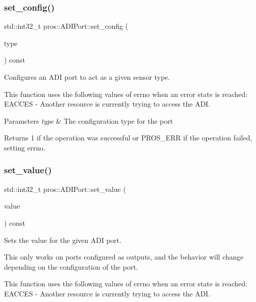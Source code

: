 \subsubsection{\texorpdfstring{set\_config()}{set\_config()}}
{\footnotesize\ttfamily std\+::int32\+\_\+t pros\+::\+A\+D\+I\+Port\+::set\+\_\+config (\begin{DoxyParamCaption}\item[{\mbox{\hyperlink{adi_8h_a4efff81399e823764aa05cd5c172ea55}{adi\+\_\+port\+\_\+config\+\_\+e\+\_\+t}}}]{type }\end{DoxyParamCaption}) const}



Configures an A\+DI port to act as a given sensor type. 

This function uses the following values of errno when an error state is reached\+: E\+A\+C\+C\+ES -\/ Another resource is currently trying to access the A\+DI.


\begin{DoxyParams}{Parameters}
{\em type} & The configuration type for the port\\
\hline
\end{DoxyParams}
\begin{DoxyReturn}{Returns}
1 if the operation was successful or P\+R\+O\+S\+\_\+\+E\+RR if the operation failed, setting errno. 
\end{DoxyReturn}
\mbox{\label{classpros_1_1ADIPort_ae6711117fbceb3bb6e3602c4ef63aff1}} 
\subsubsection{\texorpdfstring{set\_value()}{set\_value()}}
{\footnotesize\ttfamily std\+::int32\+\_\+t pros\+::\+A\+D\+I\+Port\+::set\+\_\+value (\begin{DoxyParamCaption}\item[{std\+::int32\+\_\+t}]{value }\end{DoxyParamCaption}) const}



Sets the value for the given A\+DI port. 

This only works on ports configured as outputs, and the behavior will change depending on the configuration of the port.

This function uses the following values of errno when an error state is reached\+: E\+A\+C\+C\+ES -\/ Another resource is currently trying to access the A\+DI.


